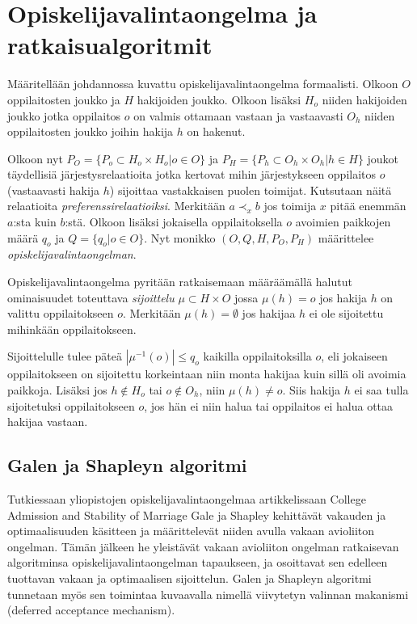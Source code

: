 \documentclass[gradu, twoside]{tktltiki}
\begin{document}
\section{Opiskelijavalintaongelma ja ratkaisualgoritmit}
\label{algoritmit_luku}

Määritellään johdannossa kuvattu opiskelijavalintaongelma formaalisti.
Olkoon $O$ oppilaitosten joukko ja $H$ hakijoiden joukko. Olkoon
lisäksi $H_o$ niiden hakijoiden joukko jotka oppilaitos $o$ on valmis
ottamaan vastaan ja vastaavasti $O_h$ niiden oppilaitosten joukko
joihin hakija $h$ on hakenut.
\newpage

Olkoon nyt $P_O = \{P_o \subset H_o \times H_o | o \in O\}$ ja $P_H =
\{P_h \subset O_h \times O_h | h \in H\}$ joukot täydellisiä
järjestysrelaatioita jotka kertovat mihin järjestykseen oppilaitos $o$
(vastaavasti hakija $h$) sijoittaa vastakkaisen puolen toimijat.
Kutsutaan näitä relaatioita \emph{preferenssirelaatioiksi}. Merkitään
$a \prec_x b$ jos toimija $x$ pitää enemmän $a$:sta kuin $b$:stä.
Olkoon lisäksi jokaisella oppilaitoksella $o$ avoimien paikkojen määrä
$q_o$ ja $Q = \{q_o | o \in O\}$. Nyt monikko $(O, Q, H, P_O, P_H)$
määrittelee \emph{opiskelijavalintaongelman}.

Opiskelijavalintaongelma pyritään ratkaisemaan määräämällä halutut
ominaisuudet toteuttava \emph{sijoittelu} $\mu \subset H \times O$
jossa $\mu(h) = o$ jos hakija $h$ on valittu oppilaitokseen $o$.
Merkitään $\mu(h) = \emptyset$ jos hakijaa $h$ ei ole sijoitettu
mihinkään oppilaitokseen.

Sijoittelulle tulee päteä $|\mu^{-1}(o)| \leq q_o$ kaikilla
oppilaitoksilla $o$, eli jokaiseen oppilaitokseen on sijoitettu
korkeintaan niin monta hakijaa kuin sillä oli avoimia paikkoja.
Lisäksi jos $h \notin H_o$ tai $o \notin O_h$, niin $\mu(h) \neq o$.
Siis hakija $h$ ei saa tulla sijoitetuksi oppilaitokseen $o$, jos hän
ei niin halua tai oppilaitos ei halua ottaa hakijaa vastaan.

\subsection{Galen ja Shapleyn algoritmi}

Tutkiessaan yliopistojen opiskelijavalintaongelmaa artikkelissaan
College Admission and Stability of Marriage Gale ja Shapley kehittävät
vakauden ja optimaalisuuden käsitteen ja määrittelevät niiden avulla
vakaan avioliiton ongelman. Tämän jälkeen he yleistävät vakaan
avioliiton ongelman ratkaisevan algoritminsa opiskelijavalintaongelman
tapaukseen, ja osoittavat sen edelleen tuottavan vakaan ja
optimaalisen sijoittelun. Galen ja Shapleyn algoritmi tunnetaan myös
sen toimintaa kuvaavalla nimellä viivytetyn valinnan makanismi
(deferred acceptance mechanism). \cite{galeshapley62}
\newpage
\end{document}
